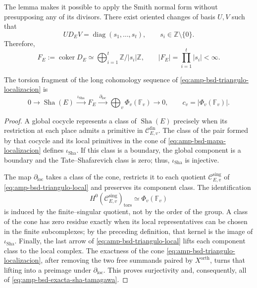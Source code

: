 The lemma makes it possible to apply the Smith normal form without presupposing any of
its divisors. There exist oriented changes of basis \(U,V\) such that
\begin{equation}\label{eq:amp-bsd-morfismo-smith}
 U D_E V=\operatorname{diag}(s_1,\ldots,s_t),
 \qquad s_i\in\mathbb Z\setminus\{0\}.
\end{equation}
Therefore,
\begin{equation}\label{eq:amp-bsd-grupo-smith}
 F_E:=\operatorname{coker}D_E
 \simeq\bigoplus_{i=1}^{t}\mathbb Z/|s_i|\mathbb Z,
 \qquad
 |F_E|=\prod_{i=1}^{t}|s_i|<\infty.
\end{equation}

\begin{lemma}
\label{lem:amp-bsd-exactitud-sha-tamagawa}
The torsion fragment of the long cohomology sequence of
\eqref{eq:amp-bsd-triangulo-localizacion} is
\begin{equation}\label{eq:amp-bsd-exacta-sha-tamagawa}
 0\longrightarrow\operatorname{Sha}(E)
 \xrightarrow{\ \iota_{\mathrm{Sha}}\ }F_E
 \xrightarrow{\ \partial_{\mathrm{loc}}\ }
 \bigoplus_v\Phi_v(\mathbb F_v)
 \longrightarrow0,
 \qquad c_v=|\Phi_v(\mathbb F_v)|.
\end{equation}
\end{lemma}

\begin{proof}
A global cocycle represents a class of
\(\operatorname{Sha}(E)\) precisely when its restriction at each place
admits a primitive in
\(\mathcal C_{E,v}^{\mathrm{fin}}\). The class of the pair formed by that
cocycle and its local primitives in the cone of
\eqref{eq:amp-bsd-mapa-localizacion} defines
\(\iota_{\mathrm{Sha}}\). If this class is a boundary, the global component is a
boundary and the Tate--Shafarevich class is zero; thus,
\(\iota_{\mathrm{Sha}}\) is injective.

The map \(\partial_{\mathrm{loc}}\) takes a class of the cone, restricts it to
each quotient
\(\mathcal C_{E,v}^{\mathrm{sing}}\) of
\eqref{eq:amp-bsd-triangulo-local} and preserves its component class. The
identification
\[
 H^0(\mathcal C_{E,v}^{\mathrm{sing}})_{\mathrm{tors}}
 \simeq\Phi_v(\mathbb F_v)
\]
is induced by the finite--singular quotient, not by the order of the group.
A class of the cone has zero residue exactly when its local
representatives can be chosen in the finite subcomplexes; by the preceding
definition, that kernel is the image of \(\iota_{\mathrm{Sha}}\).
Finally, the last arrow of
\eqref{eq:amp-bsd-triangulo-local} lifts each component class to the
local complex. The exactness of the cone
\eqref{eq:amp-bsd-triangulo-localizacion}, after removing the two
free summands paired by \(X^{\mathrm{orth}}\), turns that
lifting into a preimage under \(\partial_{\mathrm{loc}}\). This proves
surjectivity and, consequently, all of
\eqref{eq:amp-bsd-exacta-sha-tamagawa}.
\end{proof}

